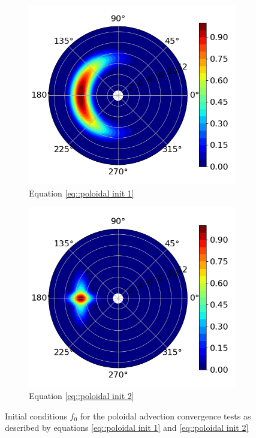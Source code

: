 \begin{figure}[ht]
\centering
\begin{subfigure}[t]{.45\textwidth}
  \includegraphics[width=\textwidth]{Figs/initConvergenceConds/Poloidal1}
  \caption{\label{fig::init Poloidal 1}Equation \ref{eq::poloidal init 1}}
 \end{subfigure}
 \hspace{.05\textwidth}
 \begin{subfigure}[t]{.45\textwidth}
  \includegraphics[width=\textwidth]{Figs/initConvergenceConds/Poloidal2}
  \caption{\label{fig::init Poloidal 2}Equation \ref{eq::poloidal init 2}}
 \end{subfigure}
 \caption{\label{fig::init conds poloidal}Initial conditions $f_0$ for the poloidal advection convergence tests as described by equations \ref{eq::poloidal init 1} and \ref{eq::poloidal init 2}}
\end{figure}


